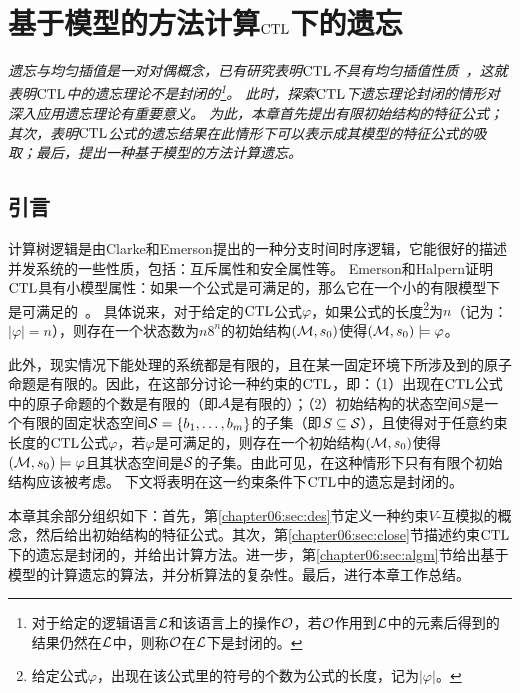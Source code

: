 \chapter{基于模型的方法计算$\textrm{CTL}$下的遗忘}\label{chapter05}

{\em
	遗忘与均匀插值是一对对偶概念，已有研究表明$\textrm{CTL}$不具有均匀插值性质~\cite{Maksimova:JANCL:1991}，这就表明$\textrm{CTL}$中的遗忘理论不是封闭的\footnote{对于给定的逻辑语言${\cal L}$和该语言上的操作${\cal O}$，若$\cal O$作用到$\cal L$中的元素后得到的结果仍然在$\cal L$中，则称$\cal O$在$\cal L$下是封闭的。}。
	此时，探索$\textrm{CTL}$下遗忘理论封闭的情形对深入应用遗忘理论有重要意义。
	为此，本章首先提出有限初始结构的特征公式；其次，表明$\textrm{CTL}$公式的遗忘结果在此情形下可以表示成其模型的特征公式的吸取；最后，提出一种基于模型的方法计算遗忘。%
}

\section{引言}\label{sec:chapter06_introduction}

计算树逻辑是由Clarke和Emerson提出的一种分支时间时序逻辑，它能很好的描述并发系统的一些性质，包括：互斥属性和安全属性等。
Emerson和Halpern证明$\textrm{CTL}$具有小模型属性：如果一个公式是可满足的，那么它在一个小的有限模型下是可满足的~\cite{DBLP:journals/jcss/EmersonH85}。
具体说来，对于给定的$\textrm{CTL}$公式$\varphi$，如果公式的长度\footnote{给定公式$\varphi$，出现在该公式里的符号的个数为公式的长度，记为$|\varphi|$。}为$n$（记为：$|\varphi| = n$），则存在一个状态数为$n8^n$的初始结构$({\cal M},s_0)$使得$({\cal M},s_0)\models \varphi$。

此外，现实情况下能处理的系统都是有限的，且在某一固定环境下所涉及到的原子命题是有限的。因此，在这部分讨论一种约束的$\textrm{CTL}$，即：（1）出现在$\textrm{CTL}$公式中的原子命题的个数是有限的（即${\cal A}$是有限的）；（2）初始结构的状态空间$S$是一个有限的固定状态空间${\cal S}=\{b_1,\ldots,b_m\}$的子集（即$S \subseteq {\cal S}$），且使得对于任意约束长度的$\textrm{CTL}$公式$\varphi$，若$\varphi$是可满足的，则存在一个初始结构$({\cal M},s_0)$使得$({\cal M},s_0)\models \varphi$且其状态空间是${\cal S}$的子集。由此可见，在这种情形下只有有限个初始结构应该被考虑。
下文将表明在这一约束条件下$\textrm{CTL}$中的遗忘是封闭的。

本章其余部分组织如下：首先，第\ref{chapter06:sec:des}节定义一种约束$V$-互模拟的概念，然后给出初始结构的特征公式。其次，第\ref{chapter06:sec:close}节描述约束$\textrm{CTL}$下的遗忘是封闭的，并给出计算方法。进一步，第\ref{chapter06:sec:algm}节给出基于模型的计算遗忘的算法，并分析算法的复杂性。最后，进行本章工作总结。

